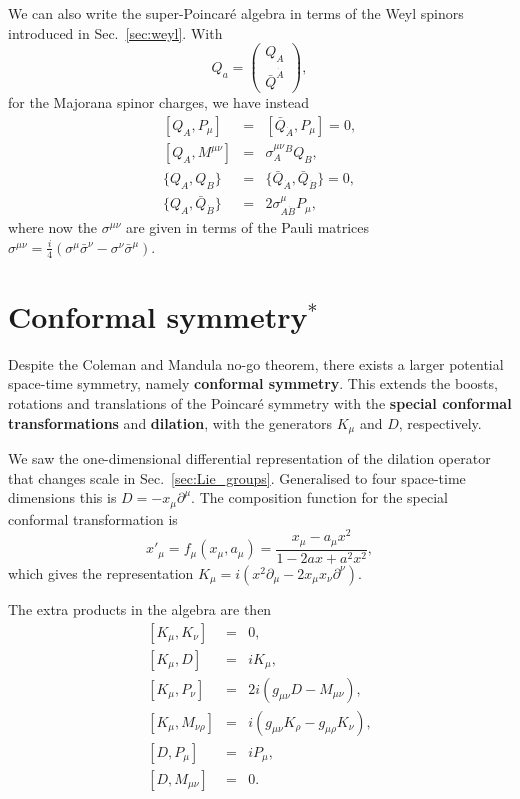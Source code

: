 \documentclass[notes.tex]{subfiles}
\begin{document}
We can also write the super-Poincaré algebra in terms of the Weyl spinors introduced in Sec.~\ref{sec:weyl}. With 
\begin{equation}
Q_a=\begin{pmatrix} Q_A\\ \bar{Q}^{\dot{A}} \end{pmatrix},
\end{equation}
for the Majorana spinor charges, we have instead
\begin{eqnarray}
\left[Q_A, P_\mu\right] &=& [\bar{Q}_{\dot{A}}, P_\mu] = 0, \label{eq:QPweyl}\\
\left[Q_A, M^{\mu \nu}\right] &=& \sigma^{\mu\nu}_A{}^B Q_B,  \label{eq:QMweyl}\\
\{Q_A, Q_B\} &=& \{\bar{Q}_{\dot{A}}, \bar{Q}_{\dot{B}}\} = 0,\label{eq:QQweyl}\\
\{Q_A, \bar{Q}_{\dot{B}}\} &=& 2\sigma^\mu_{A\dot{B}}P_\mu, \label{eq:QQbarweyl}
\end{eqnarray}
where now the  $\sigma^{\mu\nu}$ are given in terms of the Pauli matrices $\sigma^{\mu\nu} = \frac{i}{4}(\sigma^\mu \bar{\sigma}^\nu - \sigma^\nu \bar{\sigma}^\mu)$.




\section{Conformal symmetry$^*$}
Despite the Coleman and Mandula no-go theorem, there exists a larger potential space-time symmetry, namely {\bf conformal symmetry}. This extends the boosts, rotations and translations of the Poincaré symmetry with the {\bf special conformal transformations} and {\bf dilation},  with the generators $K_\mu$ and $D$, respectively. 

We saw the one-dimensional differential representation of the dilation operator that changes scale in Sec.~\ref{sec:Lie_groups}. Generalised to four space-time dimensions this is $D=-x_\mu\partial^\mu$. The composition function for the special conformal transformation is
\begin{equation}
x'_\mu=f_\mu(x_\mu,a_\mu)=\frac{x_\mu-a_\mu x^2}{1-2ax+a^2x^2},
\end{equation}
which gives the representation $K_\mu=i(x^2\partial_\mu-2x_\mu x_\nu\partial^\nu)$.

The extra products in the algebra are then
\begin{eqnarray}
\left[K_\mu, K_\nu \right] &=& 0, \\
\left[K_\mu, D \right] &=& iK_\mu, \\
\left[K_\mu, P_\nu \right] &=& 2i(g_{\mu\nu}D-M_{\mu\nu}), \\
\left[K_\mu, M_{\nu\rho} \right] &=& i(g_{\mu\nu}K_\rho-g_{\mu\rho}K_\nu), \\
\left[D, P_\mu \right] &=& iP_\mu, \\
\left[D, M_{\mu\nu}\right] &=& 0.
\end{eqnarray}
\end{document}
